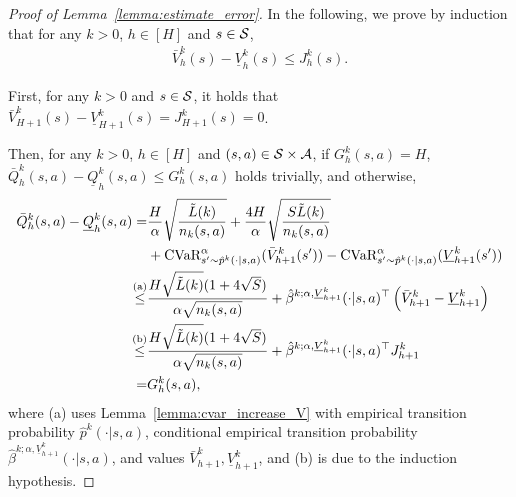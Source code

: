 \begin{proof}[Proof of Lemma~\ref{lemma:estimate_error}]
	In the following, we prove by induction that for any $k>0$, $h \in [H]$ and $s \in \mathcal{S}$,
	\begin{align}
		\bar{V}^k_h(s)-\underline{V}^k_h(s) \leq J^k_h(s) . \label{eq:bpi_est_err_induction}
	\end{align}
	
	First, for any $k>0$ and $s \in \mathcal{S}$, it holds that $\bar{V}^k_{H+1}(s)-\underline{V}^k_{H+1}(s) = J^k_{H+1}(s)=0$.
	
	
	
	Then, for any $k>0$, $h \in [H]$ and $(s,a) \in \mathcal{S} \times \mathcal{A}$, if $G^k_h(s,a)=H$, $\bar{Q}^k_h(s,a)-\underline{Q}^k_h(s,a) \leq G^k_h(s,a)$ holds trivially, and otherwise,
	\begin{align*}
		\bar{Q}^k_h(s,a)-\underline{Q}^k_h(s,a) = & \frac{H}{\alpha}\sqrt{\frac{\tilde{L}(k)}{n_k(s,a)}} + \frac{4H}{\alpha}\sqrt{\frac{S \tilde{L}(k)}{n_k(s,a)}} 
		\\ & + \textup{CVaR}^{\alpha}_{s' \sim \hat{p}^k(\cdot|s,a)}(\bar{V}^k_{h+1}(s')) - \textup{CVaR}^{\alpha}_{s' \sim \hat{p}^k(\cdot|s,a)}(\underline{V}^k_{h+1}(s')) 
		\\
		\overset{\textup{(a)}}{\leq} & \frac{H\sqrt{\tilde{L}(k)}(1+4\sqrt{S})}{\alpha \sqrt{n_k(s,a)}} + \hat{\beta}^{k;\alpha,\underline{V}^k_{h+1}}(\cdot|s,a)^\top \left( \bar{V}^k_{h+1}-\underline{V}^k_{h+1} \right)
		\\
		\overset{\textup{(b)}}{\leq} & \frac{H\sqrt{\tilde{L}(k)}(1+4\sqrt{S})}{\alpha \sqrt{n_k(s,a)}} + \hat{\beta}^{k;\alpha,\underline{V}^k_{h+1}}(\cdot|s,a)^\top J^k_{h+1} 
		\\
		= & G^k_h(s,a) ,
	\end{align*}
	where (a) uses Lemma~\ref{lemma:cvar_increase_V} with empirical transition probability $\hat{p}^k(\cdot|s,a)$, conditional empirical transition probability $\hat{\beta}^{k;\alpha,\underline{V}^k_{h+1}}(\cdot|s,a)$, and values $\bar{V}^k_{h+1},\underline{V}^k_{h+1}$, and (b) is due to the induction hypothesis.
	

\end{proof}
